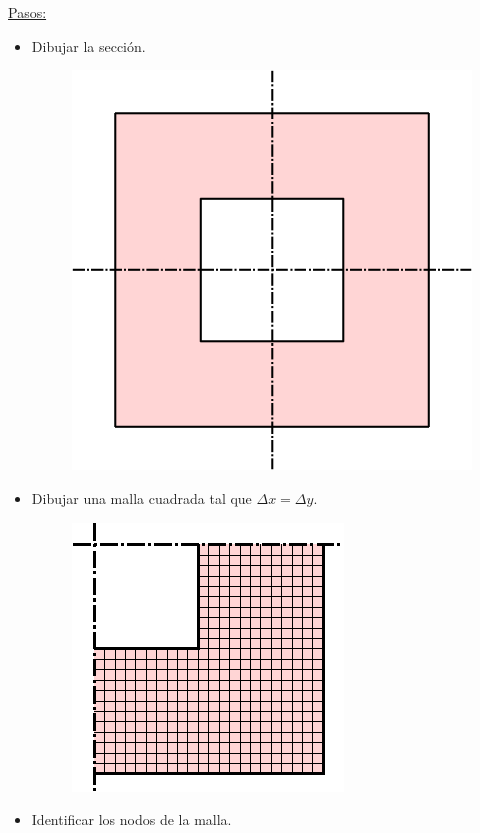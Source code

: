 \underline{Pasos:}
\begin{itemize}
    \item Dibujar la sección.
        \begin{figure}[!h]
        \centering
        \includegraphics[scale=0.80]{figura02_19.eps}
        \end{figure}
    \item Dibujar una malla cuadrada tal que $\Delta x=\Delta y$.
        \begin{figure}[!h]
        \centering
        \includegraphics[scale=1.60]{figura02_20.eps}
        \end{figure}
    \item Identificar los nodos de la malla.

\end{itemize}
